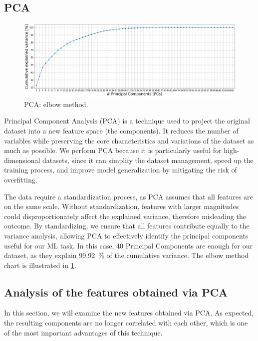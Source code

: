\documentclass[acmlarge,nonacm]{acmart}
\begin{document}
\subsection{PCA} \label{sec:PCA}
\begin{figure}
	\centering
		\includegraphics[width=1\linewidth]{img/PCAElbowMethod.png}
		 \caption{PCA: elbow method.}\label{fig:PCA}
\end{figure}
Principal Component Analysis (PCA) is a technique used to project the original dataset into a new feature space (the components). It reduces the number of variables while preserving the core characteristics and variations of the dataset as much as possible. We perform PCA because it is particularly useful for high-dimensional datasets, since it can simplify the dataset management, speed up the training process, and improve model generalization by mitigating the risk of overfitting.

The data require a standardization process, as PCA assumes that all features are on the same scale. Without standardization, features with larger magnitudes could disproportionately affect the explained variance, therefore misleading the outcome. By standardizing, we ensure that all features contribute equally to the variance analysis, allowing PCA to effectively identify the principal components useful for our ML task. In this case, 40 Principal Components are enough for our dataset, as they explain \SI{99.92}{\percent} of the cumulative variance. The elbow method chart is illustrated in \cref{fig:PCA}.

\subsection{Analysis of the features obtained via PCA} \label{sec:PC}
In this section, we will examine the new features obtained via PCA. As expected, the resulting components are no longer correlated with each other, which is one of the most important advantages of this technique.
\end{document}
